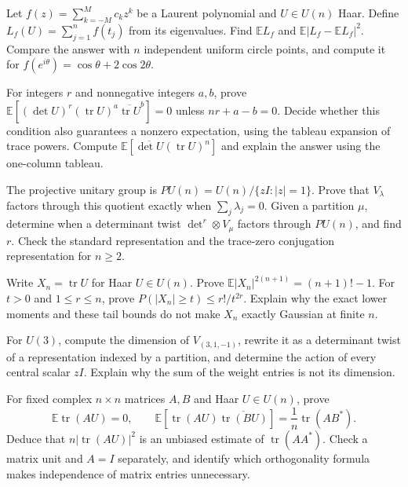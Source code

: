 \begin{exercise}[$\star\star$]\label{ex:v10new-ch11-statistic}
Let $f(z)=\sum_{k=-M}^M c_kz^k$ be a Laurent polynomial and $U\in U(n)$ Haar. Define $L_f(U)=\sum_{j=1}^n f(t_j)$ from its eigenvalues. Find $\mathbb E L_f$ and $\mathbb E|L_f-\mathbb E L_f|^2$. Compare the answer with $n$ independent uniform circle points, and compute it for $f(e^{i\theta})=\cos\theta+2\cos2\theta$.
\end{exercise}

\begin{exercise}[$\star\star$]\label{ex:v10new-ch11-detmoment}
For integers $r$ and nonnegative integers $a,b$, prove
$\mathbb E[(\det U)^r(\operatorname{tr}U)^a\overline{\operatorname{tr}U}^b]=0$
unless $nr+a-b=0$. Decide whether this condition also guarantees a nonzero expectation, using the tableau expansion of trace powers. Compute $\mathbb E[\overline{\det U}(\operatorname{tr}U)^n]$ and explain the answer using the one-column tableau.
\end{exercise}

\begin{exercise}[$\star\star$]\label{ex:v10new-ch11-projective}
The projective unitary group is $PU(n)=U(n)/\{zI:|z|=1\}$. Prove that $V_\lambda$ factors through this quotient exactly when $\sum_j\lambda_j=0$. Given a partition $\mu$, determine when a determinant twist $\det^r\otimes V_\mu$ factors through $PU(n)$, and find $r$. Check the standard representation and the trace-zero conjugation representation for $n\ge2$.
\end{exercise}

\begin{exercise}[$\star\star$]\label{ex:v10new-ch11-firstfailure}
Write $X_n=\operatorname{tr}U$ for Haar $U\in U(n)$. Prove
$\mathbb E|X_n|^{2(n+1)}=(n+1)!-1$.
For $t>0$ and $1\le r\le n$, prove
$P(|X_n|\ge t)\le r!/t^{2r}$.
Explain why the exact lower moments and these tail bounds do not make $X_n$ exactly Gaussian at finite $n$.
\end{exercise}

\begin{exercise}[$\star$]\label{ex:v10exp-ch11-weight27}
For $U(3)$, compute the dimension of $V_{(3,1,-1)}$, rewrite it as a determinant twist of a representation indexed by a partition, and determine the action of every central scalar $zI$. Explain why the sum of the weight entries is not its dimension.
\end{exercise}

\begin{exercise}[$\star\star$]\label{ex:v10exp-ch11-matrixcov}
For fixed complex $n\times n$ matrices $A,B$ and Haar $U\in U(n)$, prove
\[
 \mathbb E\operatorname{tr}(AU)=0,\qquad
 \mathbb E[\operatorname{tr}(AU)\overline{\operatorname{tr}(BU)}]
     =\frac1n\operatorname{tr}(AB^*).
\]
Deduce that $n|\operatorname{tr}(AU)|^2$ is an unbiased estimate of $\operatorname{tr}(AA^*)$. Check a matrix unit and $A=I$ separately, and identify which orthogonality formula makes independence of matrix entries unnecessary.
\end{exercise}

